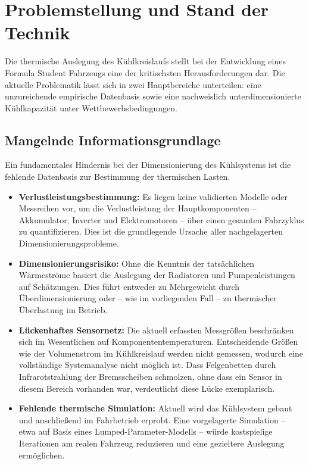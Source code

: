 \chapter{Problemstellung und Stand der Technik}
\label{ch:problemstellung}

Die thermische Auslegung des Kühlkreislaufs stellt bei der Entwicklung eines Formula Student Fahrzeugs eine der kritischsten Herausforderungen dar. Die aktuelle Problematik lässt sich in zwei Hauptbereiche unterteilen: eine unzureichende empirische Datenbasis sowie eine nachweislich unterdimensionierte Kühlkapazität unter Wettbewerbsbedingungen.

\section{Mangelnde Informationsgrundlage}
\label{sec:informationsgrundlage}

Ein fundamentales Hindernis bei der Dimensionierung des Kühlsystems ist die fehlende Datenbasis zur Bestimmung der thermischen Lasten.

\begin{itemize}
    \item \textbf{Verlustleistungsbestimmung:} Es liegen keine validierten Modelle oder Messreihen vor, um die Verlustleistung der Hauptkomponenten -- Akkumulator, Inverter und Elektromotoren -- über einen gesamten Fahrzyklus zu quantifizieren. Dies ist die grundlegende Ursache aller nachgelagerten Dimensionierungsprobleme.
    \item \textbf{Dimensionierungsrisiko:} Ohne die Kenntnis der tatsächlichen Wärmeströme basiert die Auslegung der Radiatoren und Pumpenleistungen auf Schätzungen. Dies führt entweder zu Mehrgewicht durch Überdimensionierung oder -- wie im vorliegenden Fall -- zu thermischer Überlastung im Betrieb.
    \item \textbf{Lückenhaftes Sensornetz:} Die aktuell erfassten Messgrößen beschränken sich im Wesentlichen auf Komponententemperaturen. Entscheidende Größen wie der Volumenstrom im Kühlkreislauf werden nicht gemessen, wodurch eine vollständige Systemanalyse nicht möglich ist. Dass Felgenbetten durch Infrarotstrahlung der Bremsscheiben schmolzen, ohne dass ein Sensor in diesem Bereich vorhanden war, verdeutlicht diese Lücke exemplarisch.
    \item \textbf{Fehlende thermische Simulation:} Aktuell wird das Kühlsystem gebaut und anschließend im Fahrbetrieb erprobt. Eine vorgelagerte Simulation -- etwa auf Basis eines Lumped-Parameter-Modells -- würde kostspielige Iterationen am realen Fahrzeug reduzieren und eine gezieltere Auslegung ermöglichen.
\end{itemize}

